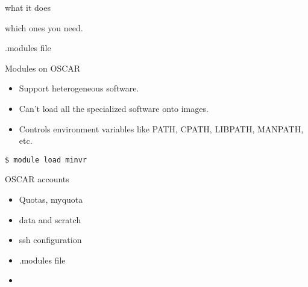 \documentclass[12pt]{article}
\begin{document}
what it does

which ones you need.

.modules file

\begin{frame}[fragile]{Modules on OSCAR}

\begin{center}
\begin{minipage}{0.9\columnwidth}
\begin{itemize}

\item Support heterogeneous software.

\item Can't load all the specialized software onto images.

\item Controls environment variables like PATH, CPATH, LIBPATH,
  MANPATH, etc.

\end{itemize}
\begin{verbatim}
$ module load minvr
\end{verbatim}

\end{minipage}
\end{center}
\end{frame}


\begin{frame}{OSCAR accounts}

\begin{center}
\begin{minipage}{0.9\columnwidth}
\begin{itemize}

\item Quotas, myquota

\item data and scratch

\item ssh configuration

\item .modules file

\end{itemize}
\end{minipage}
\end{center}
\end{frame}





\begin{frame}

\begin{center}
\begin{minipage}{0.9\columnwidth}
\begin{itemize}

\item

\end{itemize}
\end{minipage}
\end{center}
\end{frame}
\end{document}
